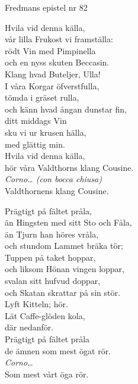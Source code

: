 \begin{song}{Fredmans epistel nr 82}
	
	
	
	
	\showversenumber
	Hvila vid denna källa,\\
	vår lilla Frukost vi framställa:\\
	rödt Vin med Pimpinella\\
	och en nyss skuten Beccasin.\\
	Klang hvad Buteljer, Ulla!\\
	I våra Korgar öfverstfulla,\\
	tömda i gräset rulla,\\
	och känn hvad ångan dunstar fin,\\
	ditt middags Vin\\
	sku vi ur krusen hälla,\\
	med glättig min.\\
	Hvila vid denna källa,\\
	hör våra Valdthorns klang Cousine.\\
	\emph{Corno\ldots{} (con bocca chiusa)}\\
	Valdthornens klang Cousine.
	
	\showversenumber
	Prägtigt på fältet pråla,\\
	än Hingsten med sitt Sto och Fåla,\\
	än Tjurn han höres vråla,\\
	och stundom Lammet bräka tör;\\
	Tuppen på taket hoppar,\\
	och liksom Hönan vingen loppar,\\
	svalan sitt hufvud doppar,\\
	och Skatan skrattar på sin stör.\\
	Lyft Kitteln; hör.\\
	Lät Caffe-glöden kola,\\
	där nedanför.\\
	Prägtigt på fältet pråla\\
	de ämnen som mest ögat rör.\\
	\emph{Corno\ldots{}}\\
	Som mest vårt öga rör.
	

\end{song}
